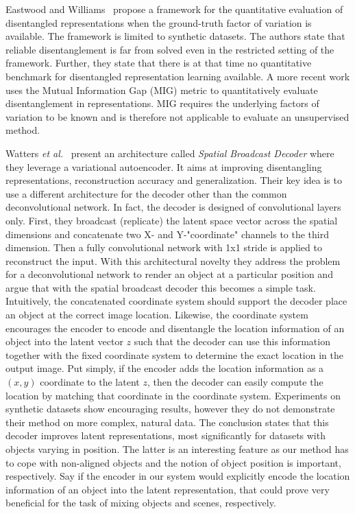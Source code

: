 \documentclass[12pt,a4paper]{article}
\begin{document}
\par Eastwood and Williams~\cite{FwkQuantEvalDisRep} propose a framework for the quantitative evaluation of disentangled representations when the ground-truth factor of variation is available. The framework is limited to synthetic datasets. The authors state that reliable disentanglement is far from solved even in the restricted setting of the framework. Further, they state that there is at that time no quantitative benchmark for disentangled representation learning available. A more recent work \cite{SpatialBDecoder} uses the Mutual Information Gap (MIG) metric to quantitatively evaluate disentanglement in representations. MIG requires the underlying factors of variation to be known and is therefore not applicable to evaluate an unsupervised method.

\par Watters \textit{et al.}~\cite{SpatialBDecoder} present an architecture called \textit{Spatial Broadcast Decoder} where they leverage a variational autoencoder. It aims at improving disentangling representations, reconstruction accuracy and generalization. Their key idea is to use a different architecture for the decoder other than the common deconvolutional network. In fact, the decoder is designed of convolutional layers only. First, they broadcast (replicate) the latent space vector across the spatial dimensions and concatenate two X- and Y-"coordinate" channels to the third dimension. Then a fully convolutional network with 1x1 stride is applied to reconstruct the input. With this architectural novelty they address the problem for a deconvolutional network to render an object at a particular position and argue that with the spatial broadcast decoder this becomes a simple task. Intuitively, the concatenated coordinate system should support the decoder place an object at the correct image location. Likewise, the coordinate system encourages the encoder to encode and disentangle the location information of an object into the latent vector $z$ such that the decoder can use this information together with the fixed coordinate system to determine the exact location in the output image. Put simply, if the encoder adds the location information as a $(x,y)$ coordinate to the latent $z$, then the decoder can easily compute the location by matching that coordinate in the coordinate system. Experiments on synthetic datasets show encouraging results, however they do not demonstrate their method on more complex, natural data. The conclusion states that this decoder improves latent representations, most significantly for datasets with objects varying in position. The latter is an interesting feature as our method has to cope with non-aligned objects and the notion of object position is important, respectively. Say if the encoder in our system would explicitly encode the location information of an object into the latent representation, that could prove very beneficial for the task of mixing objects and scenes, respectively.
\end{document}
